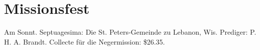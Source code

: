 \chapter{Missionsfest}

Am Sonnt. Septuagesima: Die St. Peters-Gemeinde zu Lebanon, Wis. Prediger: P. H. A. Brandt. Collecte für die Negermission: \$26.35.
